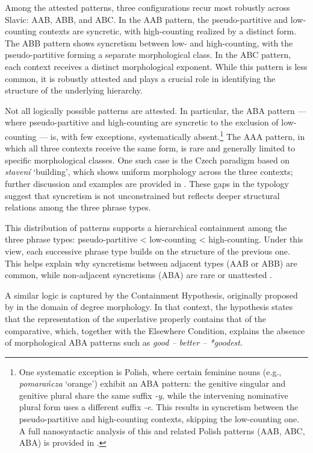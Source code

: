 \documentclass[output=paper,colorlinks,citecolor=brown
]{langscibook}
\begin{document}
Among the attested patterns, three configurations recur most robustly across Slavic: AAB, ABB, and ABC. In the AAB pattern, the pseudo-partitive and low-counting contexts are syncretic, with high-counting realized by a distinct form. The ABB pattern shows syncretism between low- and high-counting, with the pseudo-partitive forming a separate morphological class. In the ABC pattern, each context receives a distinct morphological exponent. While this pattern is less common, it is robustly attested and plays a crucial role in identifying the structure of the underlying hierarchy.

Not all logically possible patterns are attested. In particular, the ABA pattern — where pseudo-partitive and high-counting are syncretic to the exclusion of low-counting — is, with few exceptions, systematically absent.\footnote{One systematic exception is Polish, where certain feminine nouns (e.g., \textit{pomarańcza} ‘orange’) exhibit an ABA pattern: the genitive singular and genitive plural share the same suffix \textit{-y}, while the intervening nominative plural form uses a different suffix \textit{-e}. This results in syncretism between the pseudo-partitive and high-counting contexts, skipping the low-counting one. A full nanosyntactic analysis of this and related Polish patterns (AAB, ABC, ABA) is provided in \citet{Zoha2025Polish}.}
The AAA pattern, in which all three contexts receive the same form, is rare and generally limited to specific morphological classes. One such case is the Czech paradigm based on \textit{stavení} `building', which shows uniform morphology across the three contexts; further discussion and examples are provided in \citet{Zoha2025Olinco}. These gaps in the typology suggest that syncretism is not unconstrained but reflects deeper structural relations among the three phrase types.

This distribution of patterns supports a hierarchical containment among the three phrase types: pseudo-partitive < low-counting < high-counting. Under this view, each successive phrase type builds on the structure of the previous one. This helps explain why syncretisms between adjacent types (AAB or ABB) are common, while non-adjacent syncretisms (ABA) are rare or unattested \citep{Bobaljik2012,Caha2009}.

A similar logic is captured by the Containment Hypothesis, originally proposed by \citet{Bobaljik2012} in the domain of degree morphology. In that context, the hypothesis states that the representation of the superlative properly contains that of the comparative, which, together with the Elsewhere Condition, explains the absence of morphological ABA patterns such as \textit{good – better – *goodest}.
\end{document}
